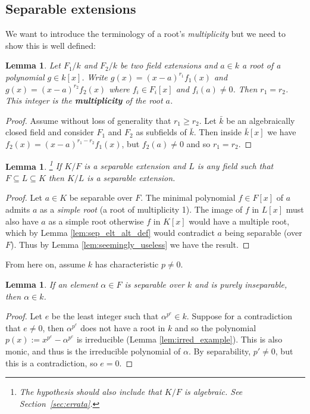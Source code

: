 \documentclass[12pt]{article}
\theoremstyle{plain}
\newtheorem{lemma}[thm]{Lemma}
\theoremstyle{definition}
\begin{document}
\subsection{Separable extensions}
%
We want to introduce the terminology of a root's \emph{multiplicity} but we need to show this is well defined:
%
\begin{lemma}
Let $F_1/k$ and $F_2/k$ be two field extensions and $a \in k$ a root of a polynomial $g \in k[x]$. Write $g(x) = (x - a)^{r_1}f_1(x)$ and $g(x) = (x-a)^{r_2}f_2(x)$ where $f_i \in F_i[x]$ and $f_i(a) \neq 0$. Then $r_1 = r_2$. This integer is the \textbf{multiplicity} of the root $a$.
\end{lemma}
\begin{proof}
Assume without loss of generality that $r_1 \geq r_2$. Let $\bar{k}$ be an algebraically closed field and consider $F_1$ and $F_2$ as subfields of $\bar{k}$. Then inside $\bar{k}[x]$ we have $f_2(x) = (x-a)^{r_1 - r_2}f_1(x)$, but $f_2(a) \neq 0$ and so $r_1 = r_2$.
\end{proof}
%
\begin{lemma}
\label{lem:sep_ext_trans_sort_of}\footnote{The hypothesis should also include that $K/F$ is algebraic. See Section~\ref{sec:errata}.}
If $K/F$ is a separable extension and $L$ is any field such that $F \subseteq L \subseteq K$ then $K/L$ is a separable extension.
\end{lemma}
\begin{proof}
Let $a \in K$ be separable over $F$. The minimal polynomial $f \in F[x]$ of $a$ admits $a$ as a \emph{simple root} (a root of multiplicity 1). The image of $f$ in $L[x]$ must also have $a$ as a simple root otherwise $f$ in $K[x]$ would have a multiple root, which by Lemma \ref{lem:sep_elt_alt_def} would contradict $a$ being separable (over $F$). Thus by Lemma \ref{lem:seemingly_useless} we have the result.
\end{proof}
From here on, assume $k$ has characteristic $p \neq 0$.
\begin{lemma}
\label{lem:insep_purely_sep}
If an element $\alpha \in F$ is separable over $k$ and is purely inseparable, then $\alpha \in k$.
\end{lemma}
\begin{proof}
Let $e$ be the least integer such that $\alpha^{p^e} \in k$. Suppose for a contradiction that $e \neq 0$, then $\alpha^{p^e}$ does not have a root in $k$ and so the polynomial $p(x) := x^{p^e} - \alpha^{p^e}$ is irreducible (Lemma \ref{lem:irred_example}). This is also monic, and thus is the irreducible polynomial of $\alpha$. By separability, $p' \neq 0$, but this is a contradiction, so $e = 0$.
\end{proof}
\end{document}

